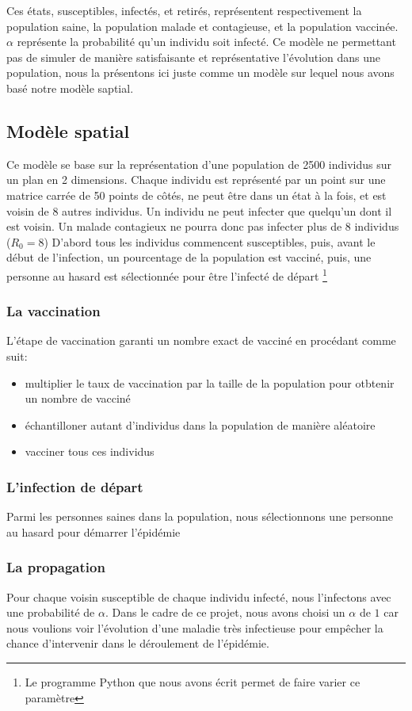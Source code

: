 \documentclass[journal, a4paper]{IEEEtran}
\begin{document}
	Ces états, susceptibles, infectés, et retirés, représentent respectivement la population saine, la population malade et contagieuse, et la population vaccinée. $\alpha$ représente la probabilité qu'un individu soit infecté.
	Ce modèle ne permettant pas de simuler de manière satisfaisante et représentative l'évolution dans une population, nous la présentons ici juste comme un modèle sur lequel nous avons basé notre modèle saptial.

	\subsection{Modèle spatial}
	Ce modèle se base sur la représentation d'une population de 2500 individus sur un plan en 2 dimensions. Chaque individu est représenté par un point sur une matrice carrée de 50 points de côtés, ne peut être dans un état à la fois, et est voisin de 8 autres individus. Un individu ne peut infecter que quelqu'un dont il est voisin. Un malade contagieux ne pourra donc pas infecter plus de 8 individus ($R_0 = 8$)
	D'abord tous les individus commencent susceptibles, puis, avant le début de l'infection, un pourcentage de la population est vacciné, puis, une personne au hasard est sélectionnée pour être l'infecté de départ \footnote{Le programme Python que nous avons écrit permet de faire varier ce paramètre}
	\subsubsection{La vaccination}
	L'étape de vaccination garanti un nombre exact de vacciné en procédant comme suit:
	\begin{itemize}
		\item multiplier le taux de vaccination par la taille de la population pour otbtenir un nombre de vacciné
		\item échantilloner autant d'individus dans la population de manière aléatoire
		\item vacciner tous ces individus
	\end{itemize}
	\subsubsection{L'infection de départ}
	Parmi les personnes saines dans la population, nous sélectionnons une personne au hasard pour démarrer l'épidémie
	\subsubsection{La propagation}
	Pour chaque voisin susceptible de chaque individu infecté, nous l'infectons avec une probabilité de $\alpha$. Dans le cadre de ce projet, nous avons choisi un $\alpha$ de $1$ car nous voulions voir l'évolution d'une maladie très infectieuse pour empêcher la chance d'intervenir dans le déroulement de l'épidémie.
\end{document}
